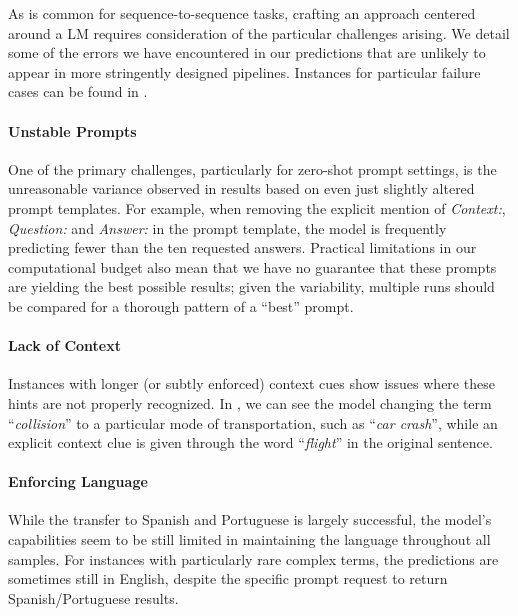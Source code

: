 \documentclass[11pt]{article}
\begin{document}
As is common for sequence-to-sequence tasks, crafting an approach centered around a LM requires consideration of the particular challenges arising.
We detail some of the errors we have encountered in our predictions that are unlikely to appear in more stringently designed pipelines.
Instances for particular failure cases can be found in .

\paragraph{Unstable Prompts}
One of the primary challenges, particularly for zero-shot prompt settings, is the unreasonable variance observed in results based on even just slightly altered prompt templates.
For example, when removing the explicit mention of \emph{Context:}, \emph{Question:} and \emph{Answer:} in the prompt template, the model is frequently predicting fewer than the ten requested answers.
Practical limitations in our computational budget also mean that we have no guarantee that these prompts are yielding the best possible results; given the variability, multiple runs should be compared for a thorough pattern of a ``best'' prompt.

\paragraph{Lack of Context}
Instances with longer (or subtly enforced) context cues show issues where these hints are not properly recognized. In , we can see the model changing the term ``\emph{collision}'' to a particular mode of transportation, such as ``\emph{car crash}'', while an explicit context clue is given through the word ``\emph{flight}'' in the original sentence.

\paragraph{Enforcing Language}
While the transfer to Spanish and Portuguese is largely successful, the model's capabilities seem to be still limited in maintaining the language throughout all samples. For instances with particularly rare complex terms, the predictions are sometimes still in English, despite the specific prompt request to return Spanish/Portuguese results.
\end{document}
